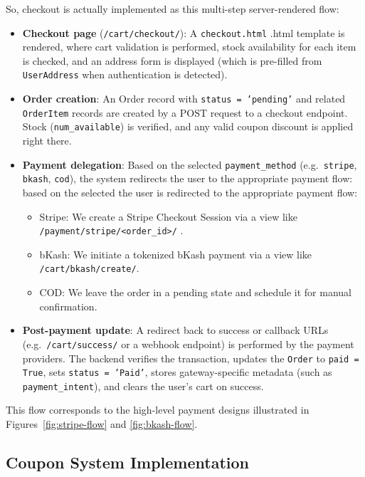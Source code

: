 So, checkout is actually implemented as this multi-step server-rendered flow:

\begin{itemize}
  \item \textbf{Checkout page} (\texttt{/cart/checkout/}): A \texttt{checkout.html} .html template is rendered, where cart validation is performed, stock availability for each item is checked, and an address form is displayed (which is pre-filled from  \texttt{UserAddress} when authentication is detected).
  \item \textbf{Order creation}: 
An Order record with \texttt{status = 'pending'}  and related \texttt{OrderItem} records are created by a POST request to a checkout endpoint. Stock (\texttt{num\_available}) is verified, and any valid coupon discount is applied right there.
  \item \textbf{Payment delegation}: 
Based on the selected \texttt{payment\_method} (e.g.\ \texttt{stripe}, \texttt{bkash}, \texttt{cod}), the system redirects the user to the appropriate payment flow:
based on the selected the user is redirected to the appropriate payment flow:
  \begin{itemize}
    \item Stripe: We create a Stripe Checkout Session via a view like \texttt{/payment/stripe/<order\_id>/} .
    \item bKash: We initiate a tokenized bKash payment via a view like \texttt{/cart/bkash/create/}.
    \item COD: We leave the order in a pending state and schedule it for manual confirmation.
  \end{itemize}
  \item \textbf{Post-payment update}: A redirect back to success or callback URLs (e.g.\ \texttt{/cart/success/} or a webhook endpoint) is performed by the payment providers. The backend verifies the transaction, updates the \texttt{Order} to \texttt{paid = True}, sets \texttt{status = 'Paid'}, stores gateway-specific metadata (such as \texttt{payment\_intent}), and clears the user’s cart on success.
\end{itemize}

This flow corresponds to the high-level payment designs illustrated in Figures~\ref{fig:stripe-flow} and \ref{fig:bkash-flow}.

\subsection{Coupon System Implementation}

